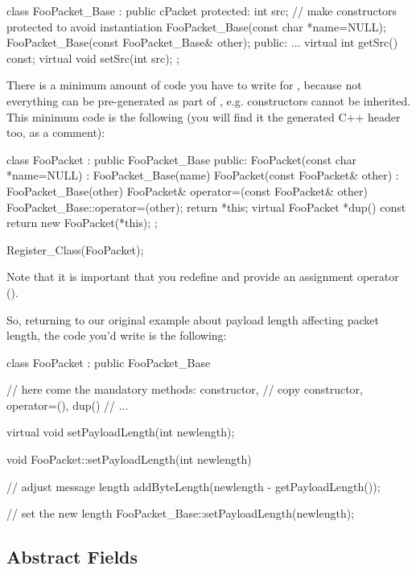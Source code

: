 \begin{cpp}
class FooPacket_Base : public cPacket
{
  protected:
    int src;
    // make constructors protected to avoid instantiation
    FooPacket_Base(const char *name=NULL);
    FooPacket_Base(const FooPacket_Base& other);
  public:
    ...
    virtual int getSrc() const;
    virtual void setSrc(int src);
};
\end{cpp}

There is a minimum amount of code you have to write
for , because not everything can be
pre-generated as part of , e.g.
constructors cannot be inherited. This minimum
code is the following (you will find it the generated C++ header
too, as a comment):

\begin{cpp}
class FooPacket : public FooPacket_Base
{
  public:
    FooPacket(const char *name=NULL) : FooPacket_Base(name) {}
    FooPacket(const FooPacket& other) : FooPacket_Base(other) {}
    FooPacket& operator=(const FooPacket& other)
        {FooPacket_Base::operator=(other); return *this;}
    virtual FooPacket *dup() const {return new FooPacket(*this);}
};

Register_Class(FooPacket);
\end{cpp}

Note that it is important that you redefine  and
provide an assignment operator ().

So, returning to our original example about payload length
affecting packet length, the code you'd write is the following:

\begin{cpp}
class FooPacket : public FooPacket_Base
{
    // here come the mandatory methods: constructor,
    // copy constructor, operator=(), dup()
    // ...

    virtual void setPayloadLength(int newlength);
}

void FooPacket::setPayloadLength(int newlength)
{
    // adjust message length
    addByteLength(newlength - getPayloadLength());

    // set the new length
    FooPacket_Base::setPayloadLength(newlength);
}
\end{cpp}



\subsection{Abstract Fields}
\label{sec:ch-msg-defs:abstract-fields}

